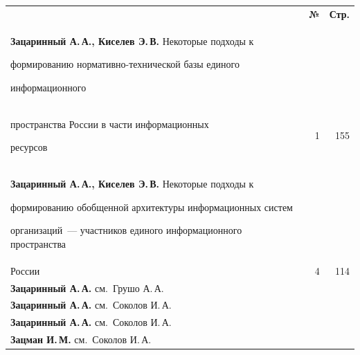 \pagebreak





\def\rightkol{АВТОРСКИЙ УКАЗАТЕЛЬ ЗА 2015 г.}


\def\leftkol{АВТОРСКИЙ УКАЗАТЕЛЬ ЗА 2015 г.}





\noindent


{\tabcolsep=2.5pt


\begin{tabular}{p{317.5pt}rr}


&\multicolumn{1}{c}{\textbf{№}} & \textbf{Стр.}\\[6pt]


\hangindent=21pt\noindent\textbf{Зацаринный А.\,А., Киселев Э.\,В.} Некоторые подходы к


формированию нормативно-технической базы единого


информационного\linebreak


\\[-12pt]


\hspace*{21pt}пространства России в части информационных


ресурсов&1&155\\[.5pt]


\hangindent=21pt\noindent\textbf{Зацаринный А.\,А., Киселев Э.\,В.} Некоторые подходы к


формированию обобщенной архитектуры информационных систем


организаций~--- участников единого информационного пространства\linebreak


\\[-12pt]


\hspace*{21pt}России&4&114\\[.5pt]


\textbf{Зацаринный А.\,А.} см.\ Грушо А.\,А.&&\\[.5pt]


\textbf{Зацаринный А.\,А.} см.\ Соколов И.\,А.&&\\[.5pt]


\textbf{Зацаринный А.\,А.} см.\ Соколов И.\,А.&&\\[.5pt]


\textbf{Зацман И.\,М.} см.\ Соколов И.\,А.&&\\[.5pt]



\end{tabular}}
